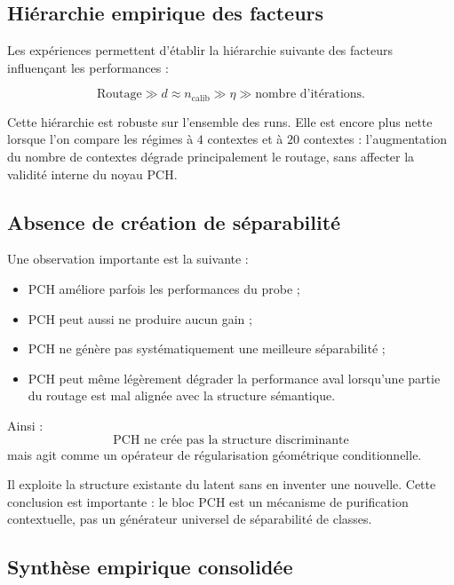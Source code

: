 \documentclass[11pt,a4paper]{article}
\newcommand{\1}{\mathbf 1}
\begin{document}
\subsection{Hiérarchie empirique des facteurs}

Les expériences permettent d’établir la hiérarchie suivante des facteurs influençant les performances :

\[
\text{Routage}
\gg
d
\approx
n_{\mathrm{calib}}
\gg
\eta
\gg
\text{nombre d’itérations}.
\]

Cette hiérarchie est robuste sur l’ensemble des runs. Elle est encore plus nette lorsque l’on compare les régimes à \(4\) contextes et à \(20\) contextes : l’augmentation du nombre de contextes dégrade principalement le routage, sans affecter la validité interne du noyau PCH.

\subsection{Absence de création de séparabilité}

Une observation importante est la suivante :

\begin{itemize}[leftmargin=2em]
\item PCH améliore parfois les performances du probe ;
\item PCH peut aussi ne produire aucun gain ;
\item PCH ne génère pas systématiquement une meilleure séparabilité ;
\item PCH peut même légèrement dégrader la performance aval lorsqu’une partie du routage est mal alignée avec la structure sémantique.
\end{itemize}

Ainsi :
\[
\text{PCH ne crée pas la structure discriminante}
\]
mais agit comme un opérateur de régularisation géométrique conditionnelle.

Il exploite la structure existante du latent sans en inventer une nouvelle. Cette conclusion est importante : le bloc PCH est un mécanisme de purification contextuelle, pas un générateur universel de séparabilité de classes.

\subsection{Synthèse empirique consolidée}
\end{document}
